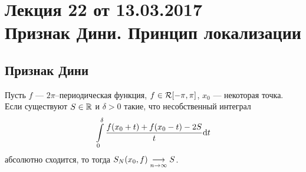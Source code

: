 \pagestyle{fancy}
\section{Лекция 22 от 13.03.2017 \\  Признак Дини. Принцип локализации}
\subsection{Признак Дини}
\begin{Theorem}
Пусть $f$ --- $2\pi$--периодическая функция, $f \in \mathcal{R}[-\pi, \pi]$, $x_0$ --- некоторая точка. Если существуют $S \in \mathbb{R}$ и $\delta > 0$ такие, что несобственный интеграл
$$
\int\limits_{0}^{\delta}\dfrac{f(x_0 + t) + f(x_0 - t) - 2S}{t}\mathrm{d} t 
$$
абсолютно сходится, то тогда $S_N(x_0, f) \underset{n\to \infty}{\longrightarrow} S$.
\end{Theorem}
